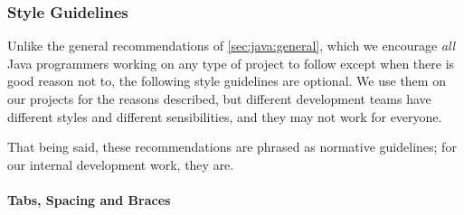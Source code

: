 \subsubsection{Style Guidelines}

Unlike the general recommendations of \autoref{sec:java:general}, which we encourage \emph{all} Java programmers working on any type of project to follow except when there is good reason not to, the following style guidelines are optional. We use them on our projects for the reasons described, but different development teams have different styles and different sensibilities, and they may not work for everyone. 

That being said, these recommendations are phrased as normative guidelines; for our internal development work, they are.

\paragraph{Tabs, Spacing and Braces}

